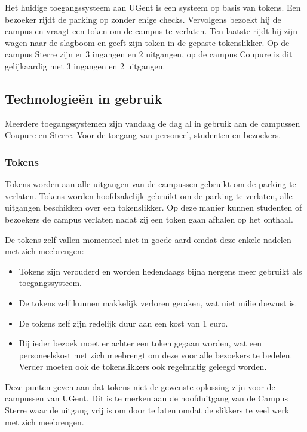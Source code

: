 Het huidige toegangssysteem aan UGent is een systeem op basis van tokens. Een bezoeker rijdt de parking op zonder enige checks. Vervolgens bezoekt hij de campus en vraagt een token om de campus te verlaten. Ten laatste rijdt hij zijn wagen naar de slagboom en geeft zijn token in de gepaste tokenslikker.
Op de campus Sterre zijn er 3 ingangen en 2 uitgangen, op de campus Coupure is dit gelijkaardig met 3 ingangen en 2 uitgangen.

\subsection{Technologieën in gebruik}
Meerdere toegangssystemen zijn vandaag de dag al in gebruik aan de campussen Coupure en Sterre. Voor de toegang van personeel, studenten en bezoekers.

\subsubsection{Tokens}

Tokens worden aan alle uitgangen van de campussen gebruikt om de parking te verlaten.
Tokens worden hoofdzakelijk gebruikt om de parking te verlaten, alle uitgangen beschikken over een tokenslikker. Op deze manier kunnen studenten of bezoekers de campus verlaten nadat zij een token gaan afhalen op het onthaal.

De tokens zelf vallen momenteel niet in goede aard omdat deze enkele nadelen met zich meebrengen:
\begin{itemize}
	\item Tokens zijn verouderd en worden hedendaags bijna nergens meer gebruikt als toegangssysteem.
	\item De tokens zelf kunnen makkelijk verloren geraken, wat niet milieubewust is.
	\item De tokens zelf zijn redelijk duur aan een kost van 1 euro.
	\item Bij ieder bezoek moet er achter een token gegaan worden, wat een personeelskost met zich meebrengt om deze voor alle bezoekers te bedelen. Verder moeten ook de tokenslikkers ook regelmatig geleegd worden.
\end{itemize}

Deze punten geven aan dat tokens niet de gewenste oplossing zijn voor de campussen van UGent. Dit is te merken aan de hoofduitgang van de Campus Sterre waar de uitgang vrij is om door te laten omdat de slikkers te veel werk met zich meebrengen.


